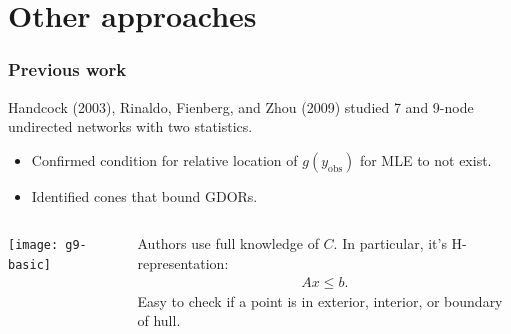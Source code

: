\documentclass[ 10pt]{beamer}
\newcommand{\yobs}{y_{\text{obs}}}
\begin{document}
\section{Other approaches}
\frame
{
  \frametitle{Previous work}  
Handcock (2003), Rinaldo, Fienberg, and Zhou (2009) studied 7 and 9-node undirected networks
with two statistics.
\begin{itemize}
	\item Confirmed condition for relative location of $g(\yobs)$ for MLE to not exist.  
	\item Identified cones that bound GDORs.%
\end{itemize}
\pause

\begin{columns}[]
\begin{column}[T]{0.4\textwidth}
\texttt{[image: g9-basic]}
\end{column}

\begin{column}[t]{0.6\textwidth}
\vspace{1mm}

Authors use full knowledge of $C$.  In particular, it's H-representation:
\begin{align*}
	Ax \leq b.
\end{align*}
Easy to check if a point is in exterior, interior, or boundary of hull.

\end{column}
\end{columns}


}

\end{document}
